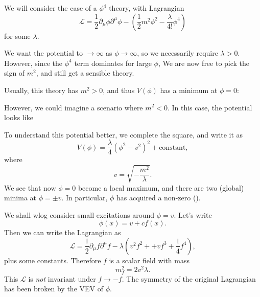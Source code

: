 \documentclass[a4paper]{article}
\begin{document}
We will consider the case of a $\phi^4$ theory, with Lagrangian
\[
  \mathcal{L} = \frac{1}{2} \partial_\mu \phi \partial^\mu \phi - \left(\frac{1}{2} m^2 \phi^2 - \frac{\lambda}{4!} \phi^4\right)
\]
for some $\lambda$.

We want the potential to $\to \infty$ as $\phi \to \infty$, so we necessarily require $\lambda > 0$. However, since the $\phi^4$ term dominates for large $\phi$, We are now free to pick the sign of $m^2$, and still get a sensible theory.

Usually, this theory has $m^2 > 0$, and thus $V(\phi)$ has a minimum at $\phi = 0$:
\begin{center}
\end{center}
However, we could imagine a scenario where $m^2 < 0$. In this case, the potential looks like
\begin{center}
\end{center}
To understand this potential better, we complete the square, and write it as
\[
  V(\phi) = \frac{\lambda}{4} (\phi^2 - v^2)^2 + \text{constant},
\]
where
\[
  v = \sqrt{-\frac{m^2}{\lambda}}.
\]
We see that now $\phi = 0$ become a local maximum, and there are two (global) minima at $\phi = \pm v$. In particular, $\phi$ has acquired a non-zero  ().

We shall wlog consider small excitations around $\phi = v$. Let's write
\[
  \phi(x) = v + cf(x).
\]
Then we can write the Lagrangian as
\[
  \mathcal{L} = \frac{1}{2} \partial_\mu f \partial^\mu f - \lambda \left(v^2 f^2 + + vf^3 + \frac{1}{4} f^4\right),
\]
plus some constants. Therefore $f$ is a scalar field with mass
\[
  m_f^2 = 2v^2 \lambda.
\]
This $\mathcal{L}$ is \emph{not} invariant under $f \to -f$. The symmetry of the original Lagrangian has been broken by the VEV of $\phi$.
\end{document}
